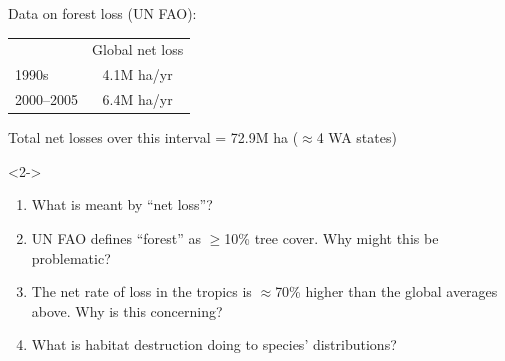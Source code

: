 \begin{frame}[t]
    \begin{adjustwidth}{-2em}{-1.5em}
        \vspace{-3mm}
        Data on forest loss (UN FAO):

        \begin{table}%
            \centering
            \begin{tabular}{ l c }
                & Global net loss \\
                \cline{2-2}
                1990s & 4.1M ha/yr \\[2ex]
                2000--2005 & 6.4M ha/yr \\
            \end{tabular}
        \end{table}

        \vspace{2mm}
        Total net losses over this interval = 72.9M ha ($\approx$4 WA states)

        \begin{uncoverenv}<2->
        \begin{enumerate}
                \small
            \item What is meant by ``net loss''?


            \item UN FAO defines ``forest'' as  $\geq$10\% tree cover. Why
                might this be problematic?


            \item The net rate of loss in the tropics is $\approx$70\% higher
                than the global averages above. Why is this concerning?


            \item What is habitat destruction doing to species' distributions?


        \end{enumerate}
        \end{uncoverenv}
    \end{adjustwidth}
\end{frame}

